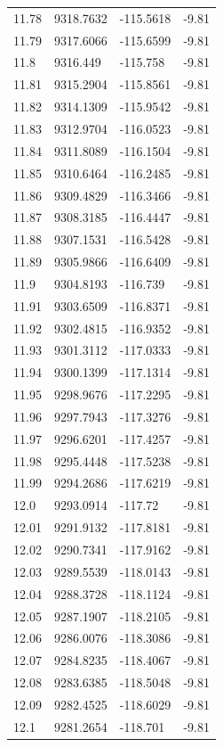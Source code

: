 \begin{table}[H]
\begin{tabular}{llll}
11.78 & 9318.7632 & -115.5618 & -9.81 \\
11.79 & 9317.6066 & -115.6599 & -9.81 \\
11.8 & 9316.449 & -115.758 & -9.81 \\
11.81 & 9315.2904 & -115.8561 & -9.81 \\
11.82 & 9314.1309 & -115.9542 & -9.81 \\
11.83 & 9312.9704 & -116.0523 & -9.81 \\
11.84 & 9311.8089 & -116.1504 & -9.81 \\
11.85 & 9310.6464 & -116.2485 & -9.81 \\
11.86 & 9309.4829 & -116.3466 & -9.81 \\
11.87 & 9308.3185 & -116.4447 & -9.81 \\
11.88 & 9307.1531 & -116.5428 & -9.81 \\
11.89 & 9305.9866 & -116.6409 & -9.81 \\
11.9 & 9304.8193 & -116.739 & -9.81 \\
11.91 & 9303.6509 & -116.8371 & -9.81 \\
11.92 & 9302.4815 & -116.9352 & -9.81 \\
11.93 & 9301.3112 & -117.0333 & -9.81 \\
11.94 & 9300.1399 & -117.1314 & -9.81 \\
11.95 & 9298.9676 & -117.2295 & -9.81 \\
11.96 & 9297.7943 & -117.3276 & -9.81 \\
11.97 & 9296.6201 & -117.4257 & -9.81 \\
11.98 & 9295.4448 & -117.5238 & -9.81 \\
11.99 & 9294.2686 & -117.6219 & -9.81 \\
12.0 & 9293.0914 & -117.72 & -9.81 \\
12.01 & 9291.9132 & -117.8181 & -9.81 \\
12.02 & 9290.7341 & -117.9162 & -9.81 \\
12.03 & 9289.5539 & -118.0143 & -9.81 \\
12.04 & 9288.3728 & -118.1124 & -9.81 \\
12.05 & 9287.1907 & -118.2105 & -9.81 \\
12.06 & 9286.0076 & -118.3086 & -9.81 \\
12.07 & 9284.8235 & -118.4067 & -9.81 \\
12.08 & 9283.6385 & -118.5048 & -9.81 \\
12.09 & 9282.4525 & -118.6029 & -9.81 \\
12.1 & 9281.2654 & -118.701 & -9.81 \\

\end{tabular}
\end{table}
